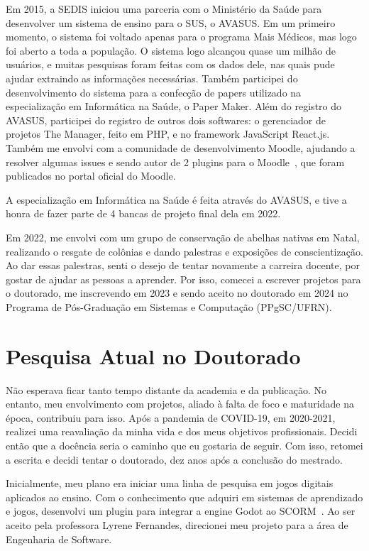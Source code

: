\documentclass[10pt,a4paper,oneside]{book}
\begin{document}
Em 2015, a SEDIS iniciou uma parceria com o Ministério da Saúde para desenvolver um sistema de ensino para o SUS, o
AVASUS. Em um primeiro momento, o sistema foi voltado apenas para o programa Mais Médicos, mas logo foi aberto a toda
a população. O sistema logo alcançou quase um milhão de usuários, e muitas pesquisas foram feitas com os dados dele,
nas quais pude ajudar extraindo as informações necessárias. Também participei do desenvolvimento do sistema para a
confecção de papers utilizado na especialização em Informática na Saúde, o Paper Maker. Além do registro do AVASUS,
participei do registro de outros dois softwares: o gerenciador de projetos The Manager, feito em PHP, e no framework
JavaScript React.js. Também me envolvi com a comunidade de desenvolvimento Moodle, ajudando a resolver algumas issues
e sendo autor de 2 plugins para o Moodle~\cite{moodle_tool_deletemessage,moodle_tool_sentry}, que foram publicados no
portal oficial do Moodle.

A especialização em Informática na Saúde é feita através do AVASUS, e tive a honra de fazer parte de 4 bancas de projeto
final dela em 2022.

Em 2022, me envolvi com um grupo de conservação de abelhas nativas em Natal, realizando o resgate de colônias e dando
palestras e exposições de conscientização. Ao dar essas palestras, senti o desejo de tentar novamente a carreira
docente, por gostar de ajudar as pessoas a aprender. Por isso, comecei a escrever projetos para o doutorado, me
inscrevendo em 2023 e sendo aceito no doutorado em 2024 no Programa de Pós-Graduação em Sistemas e Computação (PPgSC/UFRN).




\chapter{Pesquisa Atual no Doutorado}
\label{cap_pesquisa}
Não esperava ficar tanto tempo distante da academia e da publicação. No entanto, meu envolvimento com projetos, aliado
à falta de foco e maturidade na época, contribuiu para isso.
Após a pandemia de COVID-19, em 2020-2021, realizei uma reavaliação da minha vida e dos meus objetivos profissionais.
Decidi então que a docência seria o caminho que eu gostaria de seguir. Com isso, retomei a escrita e decidi tentar o
doutorado, dez anos após a conclusão do mestrado.

Inicialmente, meu plano era iniciar uma linha de pesquisa em jogos digitais aplicados ao ensino. Com o conhecimento que
adquiri em sistemas de aprendizado e jogos, desenvolvi um plugin para integrar a engine Godot ao SCORM~\cite{godot_scorm}.
Ao ser aceito pela professora Lyrene Fernandes, direcionei meu projeto para a área de Engenharia de Software.
\end{document}
